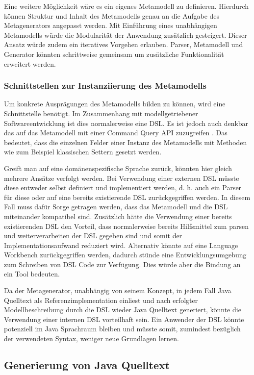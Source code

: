 \documentclass[12pt,oneside,a4paper,parskip]{scrbook}
\begin{document}
Eine weitere Möglichkeit wäre es ein eigenes Metamodell zu definieren. Hierdurch können Struktur und Inhalt des Metamodells genau an die Aufgabe des Metagenerators angepasst werden. Mit Einführung eines unabhängigen Metamodells würde die Modularität der Anwendung zusätzlich gesteigert. Dieser Ansatz würde zudem ein iteratives Vorgehen erlauben. Parser, Metamodell und Generator könnten schrittweise gemeinsam um zusätzliche Funktionalität erweitert werden.

\subsubsection{Schnittstellen zur Instanziierung des Metamodells}
Um konkrete Ausprägungen des Metamodells bilden zu können, wird eine Schnittstelle benötigt. Im Zusammenhang mit modellgetriebener Softwareentwicklung ist dies normalerweise eine DSL. Es ist jedoch auch denkbar das auf das Metamodell mit einer Command Query API zuzugreifen \cite[S. 343ff.]{fowler2010}. Das bedeutet, dass die einzelnen Felder einer Instanz des Metamodells mit Methoden wie zum Beispiel klassischen Settern gesetzt werden.

Greift man auf eine domänenspezifische Sprache zurück, könnten hier gleich mehrere Ansätze verfolgt werden. Bei Verwendung einer externen DSL müsste diese entweder selbst definiert und implementiert werden, d. h. auch ein Parser für diese oder auf eine bereits existierende DSL zurückgegriffen werden. In diesem Fall muss dafür Sorge getragen werden, dass das Metamodell und die DSL miteinander kompatibel sind. Zusätzlich hätte die Verwendung einer bereits existierenden DSL den Vorteil, dass normalerweise bereits Hilfsmittel zum parsen und weiterverarbeiten der DSL gegeben sind und somit der Implementationsaufwand reduziert wird. Alternativ könnte auf eine Language Workbench zurückgegriffen werden, dadurch stünde eine Entwicklungsumgebung zum Schreiben von DSL Code zur Verfügung. Dies würde aber die Bindung an ein Tool bedeuten.

Da der Metagenerator, unabhängig von seinem Konzept, in jedem Fall Java Quelltext als Referenzimplementation einliest und nach erfolgter Modellbeschreibung durch die DSL wieder Java Quelltext generiert, könnte die Verwendung einer internen DSL vorteilhaft sein. Ein Anwender der DSL könnte potenziell im Java Sprachraum bleiben und müsste somit, zumindest bezüglich der verwendeten Syntax, weniger neue Grundlagen lernen.

\subsection{Generierung von Java Quelltext}
\end{document}
